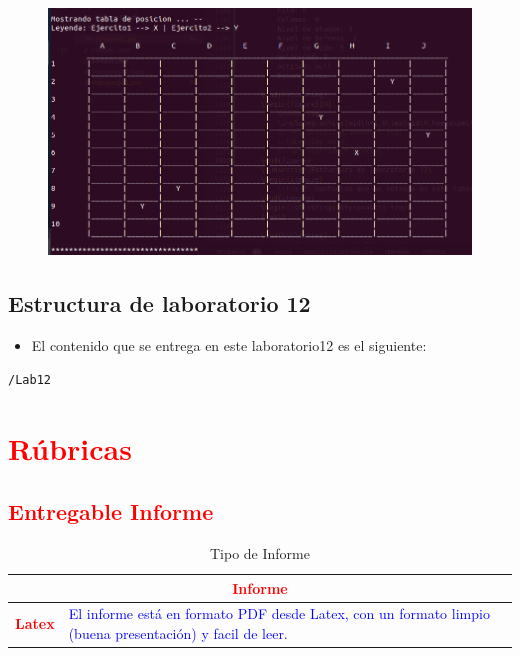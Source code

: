\documentclass{article}
\begin{document}
	\begin{figure}[H]
		\centering
		\includegraphics[width=1.0\textwidth,keepaspectratio]{img/Commit11.png}
	\end{figure}
	\subsection{Estructura de laboratorio 12}
	\begin{itemize}	
		\item El contenido que se entrega en este laboratorio12 es el siguiente:
	\end{itemize}
	\begin{lstlisting}[style=ascii-tree]
	/Lab12	

	\end{lstlisting}    
	\section{\textcolor{red}{Rúbricas}}
	
	\subsection{\textcolor{red}{Entregable Informe}}
	\begin{table}[H]
		\caption{Tipo de Informe}
		\setlength{\tabcolsep}{0.5em} %
		{\renewcommand{\arraystretch}{1.5}%
		\begin{tabular}{|p{3cm}|p{12cm}|}
			\hline
			\multicolumn{2}{|c|}{\textbf{\textcolor{red}{Informe}}}  \\
			\hline 
			\textbf{\textcolor{red}{Latex}} & \textcolor{blue}{El informe está en formato PDF desde Latex,  con un formato limpio (buena presentación) y facil de leer.}   \\ 
			\hline 
			
			
		\end{tabular}
	}
	\end{table}
	
\end{document}
